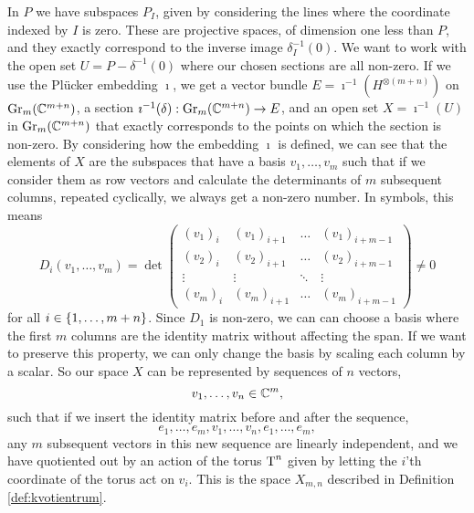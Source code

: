 In $P$ we have subspaces $P_I$, given by considering the lines where
the coordinate indexed by $I$ is zero. These are
projective spaces, of dimension one less than $P$, and they
exactly correspond to the inverse image $\delta_I^{-1}(0)$. We want to
work with the open set $U=P-\delta^{-1}(0)$ where our chosen
sections are all non-zero. If we use the Pl\"ucker embedding $\imath$,
we get a vector bundle
$E=\imath^{-1}(H^{\otimes(m+n)})$ on $\mathrm{Gr}_m(\mathbb{C}^{{m+n}})$, a section
$\imath^{-1}(\delta) : \mathrm{Gr}_m(\mathbb{C}^{{m+n}}) \to E$, and an open set
$X=\imath^{-1}(U)$ in $\mathrm{Gr}_m(\mathbb{C}^{{m+n}})$ that exactly corresponds to the points
on which the section is non-zero. By considering how the embedding
$\imath$ is defined, we can see that the elements of $X$ are
the subspaces that have a basis $v_1,\dots,v_m$ such that if we
consider
them as row vectors and calculate the determinants of $m$ subsequent
columns, repeated cyclically, we always get a non-zero number. In
symbols, this means
\[ D_i(v_1,\dots,v_m) = \det
 \begin{pmatrix}
   (v_1)_{i} & (v_1)_{i+1} & \dots  & (v_1)_{i+m-1} \\
   (v_2)_{i} & (v_2)_{i+1} & \dots  & (v_2)_{i+m-1} \\
   \vdots  & \vdots    & \ddots & \vdots       \\
   (v_m)_{i} & (v_m)_{i+1} & \dots  & (v_m)_{i+m-1}
 \end{pmatrix} \neq 0 \]
for all $i \in \left\{ 1,\dots,m+n \right\}$. Since $D_1$ is non-zero, we can
can choose a basis where the first $m$
columns are the identity matrix without affecting the span. If we
want to preserve this property, we
can only change the basis by scaling each column by a scalar. So our
space $X$ can be represented by sequences of $n$ vectors,
\[ v_1,\dots,v_n \in \mathbb{C}^m, \]
such that if
we insert the identity matrix before and after the sequence,
\[ e_1,\dots,e_m,v_1,\dots,v_n,e_1,\dots,e_m, \]
any $m$ subsequent vectors in this new sequence are linearly
independent, and we have quotiented out by an action of the torus
$\operatorname{T}^n$ given by letting the $i$'th coordinate of the torus act on
$v_i$. This is the space $X_{m,n}$ described in Definition
\ref{def:kvotientrum}.

